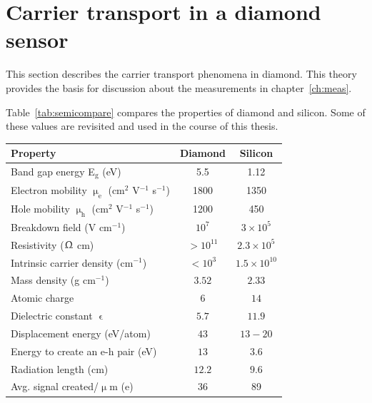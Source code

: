 \section{Carrier transport in a diamond sensor} 
\label{sec:carrtransp}
This section describes the carrier transport phenomena in diamond. This theory provides the basis for discussion about the measurements in chapter~\ref{ch:meas}. 

Table~\ref{tab:semicompare} compares the properties of diamond and silicon. Some of these values are revisited and used in the course of this thesis. 

\begin{footnotesize}
\begin{center}
\begin{tabular}{   l  c  c   }
\hline
Property & Diamond & Silicon \\
\hline
Band gap energy E$_\mathrm{g}$ (eV) & 5.5 & 1.12  \\
Electron mobility $\upmu_\mathrm{e}$ (cm$^2$ V$^{-1}$ s$^{-1}$) & 1800 & 1350 \\
Hole mobility $\upmu_\mathrm{h}$ (cm$^2$ V$^{-1}$ s$^{-1}$) & 1200 & 450 \\
Breakdown field (V cm$^{-1}$) & $10^{7}$ & $3\times 10^5$ \\
Resistivity ($\Upomega$ cm) & $>10^{11}$  & $2.3\times 10^5$  \\
Intrinsic carrier density (cm$^{-1}$) & $<10^3$ & $1.5\times 10^{10} $ \\
Mass density (g cm$^{-1}$) & $ 3.52$ & $2.33 $ \\
Atomic charge  & $6 $ & $ 14$ \\
Dielectric constant $\upvarepsilon$ & $5.7 $ & $11.9 $ \\
Displacement energy (eV/atom) & $43 $ & $13-20 $ \\
Energy to create an e-h pair  (eV) & $13 $ & $ 3.6$ \\
Radiation length (cm) & $ 12.2$ & $9.6 $ \\
Avg. signal created/$\upmu$m (e) & 36 & 89 \\\hline
\end{tabular}
\label{tab:semicompare}
\end{center}
\end{footnotesize}
 

